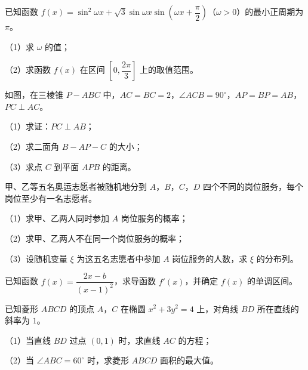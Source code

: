 \begingroup
\renewenvironment{question}{\Needspace{0.44\textheight}}{}
\begin{question}
已知函数 $f(x)=\sin^2\omega x+\sqrt3\sin\omega x\sin\left(\omega x+\dfrac{\pi}2\right)$（$\omega>0$）的最小正周期为 $\pi$。

（1）求 $\omega$ 的值；

（2）求函数 $f(x)$ 在区间 $\left[0,\dfrac{2\pi}3\right]$ 上的取值范围。

\Needspace{0.4\textheight}
\end{question}
\endgroup
\begin{question}
如图，在三棱锥 $P-ABC$ 中，$AC=BC=2$，$\angle ACB=90^\circ$，$AP=BP=AB$，$PC\perp AC$。

（1）求证：$PC\perp AB$；

（2）求二面角 $B-AP-C$ 的大小；

（3）求点 $C$ 到平面 $APB$ 的距离。
\nopagebreak[4]
\begin{center}\end{center}
\nopagebreak[4]
\end{question}
\begin{question}
甲、乙等五名奥运志愿者被随机地分到 $A$，$B$，$C$，$D$ 四个不同的岗位服务，每个岗位至少有一名志愿者。

（1）求甲、乙两人同时参加 $A$ 岗位服务的概率；

（2）求甲、乙两人不在同一个岗位服务的概率；

（3）设随机变量 $\xi$ 为这五名志愿者中参加 $A$ 岗位服务的人数，求 $\xi$ 的分布列。

\end{question}
\begin{question}
已知函数 $f(x)=\dfrac{2x-b}{(x-1)^2}$，求导函数 $f'(x)$，并确定 $f(x)$ 的单调区间。

\end{question}
\begin{question}
已知菱形 $ABCD$ 的顶点 $A$，$C$ 在椭圆 $x^2+3y^2=4$ 上，对角线 $BD$ 所在直线的斜率为 $1$。

（1）当直线 $BD$ 过点 $(0,1)$ 时，求直线 $AC$ 的方程；

（2）当 $\angle ABC=60^\circ$ 时，求菱形 $ABCD$ 面积的最大值。

\end{question}
